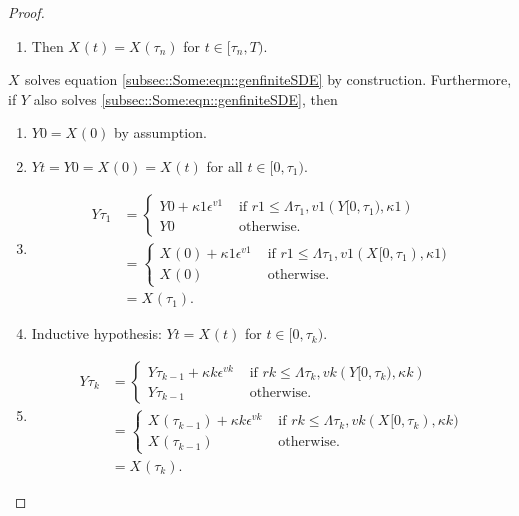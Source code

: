 \documentclass[12pt]{article}
\newcommand{\te}{\text}
\newcommand{\ep}{\epsilon}
\renewcommand{\v}{v}							%
\newcommand{\ev}{\ep}							%
\newcommand{\T}{T}								%
\renewcommand{\t}{t}							%
\newcommand{\X}{X}								%
\newcommand{\vind}[1]{^{#1}}					%
\newcommand{\cind}[1]{_{#1}}					%
\newcommand{\tp}[1]{(#1)}						%
\newcommand{\tip}[1]{#1}						%
\renewcommand{\r}{r}							%
\newcommand{\indx}[1]{_{#1}}					%
\newcommand{\XX}{Y}								%
\newcommand{\rt}{\tau}							%
\renewcommand{\it}{k}							%
\renewcommand{\mark}{\kappa}					%
\newcommand{\ratee}{\Lambda}					%
\begin{document}
\begin{proof}
\begin{enumerate}
\item Then \(\X\cind{}\tp{\t} = \X\cind{}\tp{\rt\indx{n}}\) for \(\t\in [\rt\indx{n},\T)\).
\end{enumerate}

\(\X\cind{}\tip{}\) solves equation \eqref{subsec::Some:eqn::genfiniteSDE} by construction. Furthermore, if \(\XX{}{}\) also solves \eqref{subsec::Some:eqn::genfiniteSDE}, then 

\begin{enumerate}
\item \(\XX{}{0} = \X\cind{}\tp{0}\) by assumption.

\item \(\XX{}{\t} = \XX{}{0} = \X\cind{}\tp{0} = \X\cind{}\tp{\t}\) for all \(\t\in [0,\rt\indx{1})\).

\item 

\begin{align*}
\XX{}{\rt\indx{1}} &= \begin{cases}
\XX{}{0} + \mark{1}\ev\vind{\v{1}} &\te{ if } \r{1} \leq \ratee{\rt\indx{1},\v{1}}(\XX{}{[0,\rt\indx{1})},\mark{1})\\
\XX{}{0} &\te{ otherwise.}
\end{cases}\\
&= \begin{cases}
\X\cind{}\tp{0} + \mark{1}\ev\vind{\v{1}} &\te{ if } \r{1} \leq \ratee{\rt\indx{1},\v{1}}(\X\cind{}\tip{[0,\rt\indx{1})},\mark{1})\\
\X\cind{}\tp{0} &\te{ otherwise.}
\end{cases}\\
&= \X\cind{}\tp{\rt\indx{1}}.
\end{align*}

\item Inductive hypothesis: \(\XX{}{\t} = \X\cind{}\tp{\t}\) for \(\t\in [0,\rt\indx{\it})\). 

\item 

\begin{align*}
\XX{}{\rt\indx{\it}} &= \begin{cases}
\XX{}{\rt\indx{\it-1}} + \mark{\it}\ev\vind{\v{\it}} &\te{ if } \r{\it} \leq \ratee{\rt\indx{\it},\v{\it}}(\XX{}{[0,\rt\indx{\it})},\mark{\it})\\
\XX{}{\rt\indx{\it-1}} &\te{ otherwise.}
\end{cases}\\
&= \begin{cases}
\X\cind{}\tp{\rt\indx{\it-1}} + \mark{\it}\ev\vind{\v{\it}} &\te{ if } \r{\it} \leq \ratee{\rt\indx{\it},\v{\it}}(\X\cind{}\tip{[0,\rt\indx{\it})},\mark{\it})\\
\X\cind{}\tp{\rt\indx{\it-1}} &\te{ otherwise.}
\end{cases}\\
&= \X\cind{}\tp{\rt\indx{\it}}.
\end{align*}


\end{enumerate}
\end{proof}
\end{document}
